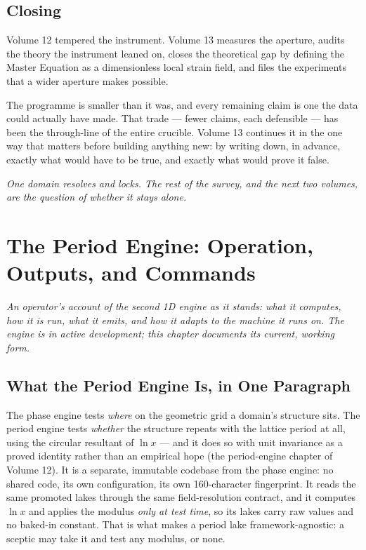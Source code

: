 \documentclass[11pt, letterpaper, openany]{book}
\begin{document}
\section{Closing}

Volume 12 tempered the instrument. Volume 13 measures the aperture, audits the theory the instrument
leaned on, closes the theoretical gap by defining the Master Equation as a dimensionless local strain field, and files the experiments that a wider aperture makes possible. 

The programme is smaller than it was, and every remaining claim is one the data could actually have
made. That trade --- fewer claims, each defensible --- has been the through-line of the entire
crucible. Volume 13 continues it in the one way that matters before building anything new: by writing
down, in advance, exactly what would have to be true, and exactly what would prove it false.

\begin{center}
\vspace{0.5em}
\itshape One domain resolves and locks. The rest of the survey, and the next two volumes, are the
question of whether it stays alone.
\vspace{0.5em}
\end{center}



\chapter{The Period Engine: Operation, Outputs, and Commands}

\begin{center}
\textit{An operator's account of the second 1D engine as it stands: what it computes,
how it is run, what it emits, and how it adapts to the machine it runs on. The engine is
in active development; this chapter documents its current, working form.}
\end{center}

\section{What the Period Engine Is, in One Paragraph}

The phase engine tests \emph{where} on the geometric grid a domain's structure sits. The period
engine tests \emph{whether} the structure repeats with the lattice period at all, using the
circular resultant of $\ln x$ --- and it does so with unit invariance as a proved identity rather
than an empirical hope (the period-engine chapter of Volume 12). It is a separate, immutable
codebase from the phase engine: no shared code, its own configuration, its own 160-character
fingerprint. It reads the same promoted lakes through the same field-resolution contract, and it
computes $\ln x$ and applies the modulus \emph{only at test time}, so its lakes carry raw values
and no baked-in constant. That is what makes a period lake framework-agnostic: a sceptic may take
it and test any modulus, or none.
\end{document}

